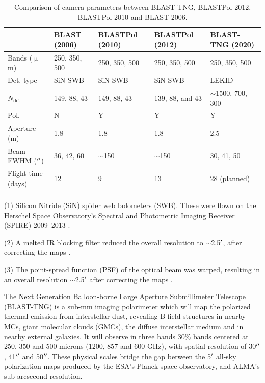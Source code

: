 \begin{table}
\begin{threeparttable}
\centering
\begin{adjustbox}{width=\textwidth}
\begin{tabular}{@{}lllll@{}}
\dtoprule
 & BLAST (2006) & BLASTPol (2010) & BLASTPol (2012) & BLAST-TNG (2020) \\ \midrule
Bands ($\upmu$m) & 250, 350, 500 & 250, 350, 500 & 250, 350, 500 & 250, 350, 500 \\
Det. type & SiN SWB\tnote{1} & SiN SWB & SiN SWB & LEKID \\
$N_{\mathrm{det}}$ & 149, 88, 43 & 149, 88, 43 & 139, 88, and 43 & $\sim$1500, 700, 300 \\
Pol. & N & Y & Y & Y \\
Aperture (m) & 1.8 & 1.8 & 1.8 & 2.5 \\
Beam FWHM ($\operatorname{^{\prime\prime}}$) & 36, 42, 60 & $\sim$150\tnote{2} & $\sim$150\tnote{3} & 30, 41, 50 \\
Flight time (days) & 12 & 9 & 13 & 28 (planned) \\ \dbottomrule
\end{tabular}
\end{adjustbox}
\begin{tablenotes}
\item (1) Silicon Nitride (SiN) spider web bolometers (SWB). These were flown on the Herschel Space Observatory's Spectral and Photometric Imaging Receiver (SPIRE) 2009--2013 \citep{griffin2003spire}.
\item (2) A melted IR blocking filter reduced the overall resolution to $\sim$2.5$\operatorname{^{\prime}}$, after correcting the maps \citep{matthews2014lupus}.
\item (3) The point-spread function (PSF) of the optical beam was warped, resulting in an overall resolution $\sim$2.5$\operatorname{^{\prime}}$ after correcting the maps \citep{fissel2016balloon}.
\end{tablenotes}
\caption{Comparison of camera parameters between BLAST-TNG, BLASTPol 2012, BLASTPol 2010 and BLAST 2006.}
\label{tab:blast_comp}
\end{threeparttable}
\end{table}

The Next Generation Balloon-borne Large Aperture Submillimeter Telescope (BLAST-TNG) is a sub-mm imaging polarimeter which will map the polarized thermal emission from interstellar dust, revealing B-field structures in nearby MCs, giant molecular clouds (GMCs), the diffuse interstellar medium and in nearby external galaxies. It will observe in three bands 30\% bands centered at 250, 350 and 500 microns (1200, 857 and 600 GHz), with spatial resolution of 30$\operatorname{^{\prime\prime}}$, 41$\operatorname{^{\prime\prime}}$ and 50$\operatorname{^{\prime\prime}}$. These physical scales bridge the gap between the 5$\operatorname{^{\prime}}$ all-sky polarization maps produced by the ESA's Planck space observatory, and ALMA's sub-arcsecond resolution.

